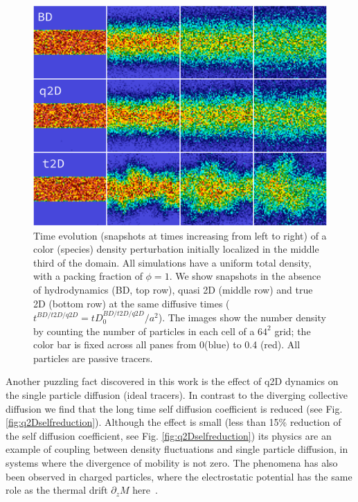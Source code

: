 \documentclass[twoside,openright,titlepage,numbers=noenddot,%
headinclude,footinclude,cleardoublepage=empty,abstract=on,
BCOR=5mm,fontsize=11pt, dvipsnames, paper=b5
]{scrreprt}
\begin{document}
\begin{figure}[H]
  \centering
  \includegraphics[width=\linewidth]{gfx/q2Dcolorstripe}
  \caption[ ]{Time evolution (snapshots at times increasing from left to right) of a color (species) density perturbation initially localized in the middle third of the domain. All simulations have a uniform total density, with a packing fraction of $\phi = 1$. We show snapshots in the absence of hydrodynamics (BD, top row), quasi 2D (middle row) and true 2D (bottom row) at the same diffusive times ($t^{BD/t2D/q2D}= tD_0^{BD/t2D/q2D}/a^2$). The images show the number density by counting the number of particles in each cell of a $64^2$ grid; the color bar is fixed across all panes from 0(blue) to 0.4 (red). All particles are passive tracers.}
  \label{fig:q2Dcolorstripe}
\end{figure}

Another puzzling fact discovered in this work is the effect of q2D dynamics on the single particle diffusion (ideal tracers).
In contrast to the diverging collective diffusion we find that the long time self diffusion coefficient is reduced (see Fig. \ref{fig:q2Dselfreduction}). Although the effect is small (less than 15\% reduction of the self diffusion coefficient, see Fig. \ref{fig:q2Dselfreduction}) its physics are an example of coupling between density fluctuations and single particle diffusion, in systems where the divergence of mobility is not zero. The phenomena has also been observed in charged particles, where the electrostatic potential has the same role as the thermal drift $\partial_zM$ here~\cite{Pelaez2018}.
\end{document}
